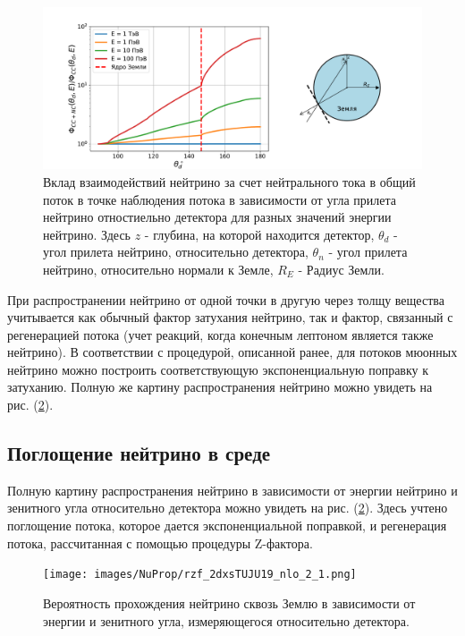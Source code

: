 \begin{figure}[!h]
\centering
\includegraphics[width=1.1\linewidth]{images/NuProp/rhh12zf_flux_index_CT18ZNNLO.pdf}
\caption{Вклад взаимодействий нейтрино за счет нейтрального тока в общий поток в точке наблюдения потока в зависимости от угла прилета нейтрино отностиельно детектора для разных значений энергии нейтрино. Здесь $z$ - глубина, на которой находится детектор, $\theta_d$ - угол прилета нейтрино, относительно детектора, $\theta_n$ - угол прилета нейтрино, относительно нормали к Земле, $R_E$ - Радиус Земли.}
\label{EF1}
\end{figure}
При распространении нейтрино от одной точки в другую через толщу вещества учитывается как обычный фактор затухания нейтрино, так и фактор, связанный с регенерацией потока (учет реакций, когда конечным лептоном является также нейтрино). В соответствии с процедурой, описанной ранее, для потоков мюонных нейтрино можно построить соответствующую экспоненциальную поправку к затуханию. Полную же картину распространения нейтрино можно увидеть на рис. (\ref{EF2}).
\subsection{Поглощение нейтрино в среде }
 Полную картину распространения нейтрино в зависимости от энергии нейтрино и зенитного угла относительно детектора  можно увидеть на рис. (\ref{EF2}). Здесь учтено поглощение потока, которое дается экспоненциальной поправкой, и регенерация потока, рассчитанная с помощью процедуры Z-фактора.
 \begin{figure}[!h]
\centering
\texttt{[image: images/NuProp/rzf\_2dxsTUJU19\_nlo\_2\_1.png]}
\caption{Вероятность прохождения нейтрино сквозь Землю в зависимости от энергии и зенитного угла, измеряющегося относительно детектора.}
\label{EF2}
\end{figure}
